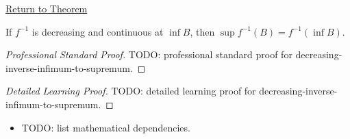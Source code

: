 \newpage
{}
\label{prf:decreasing-inverse-infimum-to-supremum}

\begin{remark*}[Return]
\hyperref[thm:decreasing-inverse-infimum-to-supremum]{Return to Theorem}
\end{remark*}

\begin{theorem*}
If $f^{-1}$ is decreasing and continuous at $\inf B$, then
$\sup f^{-1}(B)=f^{-1}(\inf B)$.
\end{theorem*}

\begin{proof}[Professional Standard Proof]
\LRAProofBodyStart
TODO: professional standard proof for decreasing-inverse-infimum-to-supremum.
\end{proof}

\begin{proof}[Detailed Learning Proof]
\LRAProofBodyStart
TODO: detailed learning proof for decreasing-inverse-infimum-to-supremum.
\end{proof}

\begin{remark*}
\end{remark*}

\begin{dependencies}
\begin{itemize}
  \item TODO: list mathematical dependencies.
\end{itemize}
\end{dependencies}

\clearpage
